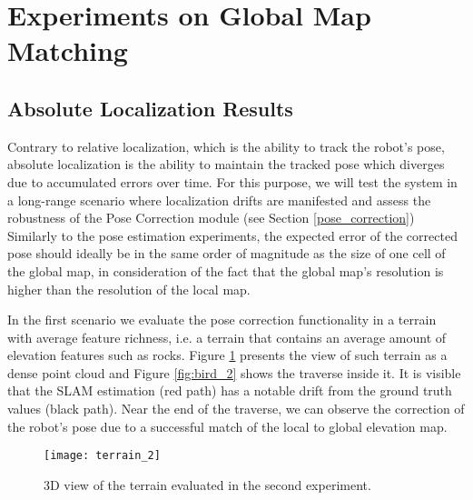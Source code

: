 \section{Experiments on Global Map Matching}

\subsection{Absolute Localization Results}

Contrary to relative localization, which is the ability to track the robot's
pose, absolute localization is the ability to maintain the tracked pose
which diverges due to accumulated errors over time.
For this purpose, we will test the system in a long-range
scenario where localization drifts are manifested and assess the robustness
of the Pose Correction module (see Section \ref{pose_correction})
Similarly to the pose estimation experiments, the expected error of the
corrected pose should ideally be in the same order of magnitude as the size of
one cell of the global map, in consideration of the fact that the global map's
resolution is higher than the resolution of the local map.

In the first scenario we evaluate the pose correction functionality in a
terrain with average feature richness, i.e. a terrain that contains
an average amount of elevation features such as rocks.
Figure \ref{fig:terrain_2} presents the view of such terrain as a dense
point cloud and Figure \ref{fig:bird_2} shows the traverse inside it.
It is visible that the SLAM estimation (red path) has a notable drift from
the ground truth values (black path).
Near the end of the traverse, we can observe the correction of the robot's pose
due to a successful match of the local to global elevation map.

\begin{figure}[h!]
    \centering
    \texttt{[image: terrain\_2]}
    \caption[Terrain of second experiment]{
        3D view of the terrain evaluated in the second experiment.
    }
    \label{fig:terrain_2}
\end{figure}

